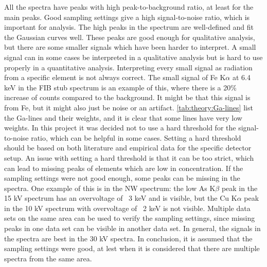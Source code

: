 All the spectra have peaks with high peak-to-background ratio, at least for the main peaks. %
Good sampling settings give a high signal-to-noise ratio, which is important for analysis.
The high peaks in the spectrum are well-defined and fit the Gaussian curves well.
These peaks are good enough for qualitative analysis, but there are some smaller signals which have been harder to interpret.
A small signal can in some cases be interpreted in a qualitative analysis but is hard to use properly in a quantitative analysis.
Interpreting every small signal as radiation from a specific element is not always correct.
The small signal of Fe K$\alpha$ at 6.4 keV in the FIB stub spectrum is an example of this, where there is a 20\% increase of counts compared to the background.
It might be that this signal is from Fe, but it might also just be noise or an artifact.
\cref{tab:theory:Ga-lines} list the Ga-lines and their weights, and it is clear that some lines have very low weights.
In this project it was decided not to use a hard threshold for the signal-to-noise ratio, which can be helpful in some cases.
Setting a hard threshold should be based on both literature and empirical data for the specific detector setup.
An issue with setting a hard threshold is that it can be too strict, which can lead to missing peaks of elements which are low in concentration.
If the sampling settings were not good enough, some peaks can be missing in the spectra.
One example of this is in the NW spectrum: the low As K$\beta$ peak in the 15 kV spectrum has an overvoltage of ~3 keV and is visible, but the Cu K$\alpha$ peak in the 10 kV spectrum with overvoltage of ~2 keV is not visible.
Multiple data sets on the same area can be used to verify the sampling settings, since missing peaks in one data set can be visible in another data set.
In general, the signals in the spectra are best in the 30 kV spectra.
In conclusion, it is assumed that the sampling settings were good, at lest when it is considered that there are multiple spectra from the same area.


